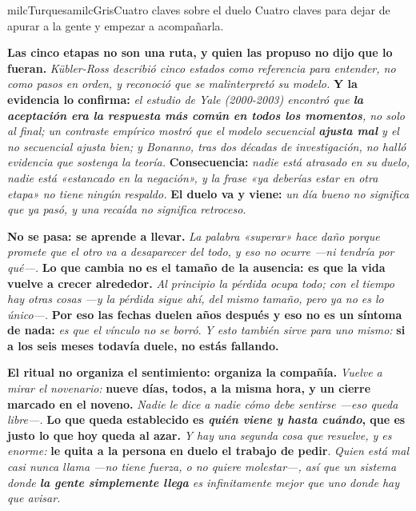 \documentclass[11pt,letterpaper]{article}
\newcommand{\milcpaso}[3]{%
\Needspace{4\baselineskip}%
\begin{tcolorbox}[enhanced,colback=white,colframe=milcLinea,arc=1.5mm,boxrule=.9pt,
  left=14mm,right=4mm,top=3mm,bottom=3mm,before skip=4pt,after skip=4pt,
  fontupper=\RaggedRight,
  overlay={\node[anchor=north west,circle,fill=#2,text=white,inner sep=0pt,
    minimum size=7.4mm,font=\sffamily\bfseries\small]
    at ([xshift=3.6mm,yshift=-3.2mm]frame.north west) {#1};}]
#3
\end{tcolorbox}}
\begin{document}
\begin{softbox}{milcTurquesa}{milcGris}{Cuatro claves sobre el duelo}
Cuatro claves para dejar de apurar a la gente y empezar a acompañarla.
\end{softbox}

\milcpaso{1}{milcTurquesa}{\textbf{Las cinco etapas no son una ruta, y quien las propuso no dijo que lo fueran.} \emph{Kübler-Ross describió cinco estados como referencia para entender, no como pasos en orden, y reconoció que se malinterpretó su modelo.} \textbf{Y la evidencia lo confirma:} \emph{el estudio de Yale (2000-2003) encontró que \textbf{la aceptación era la respuesta más común en todos los momentos}, no solo al final; un contraste empírico mostró que el modelo secuencial \textbf{ajusta mal} y el no secuencial ajusta bien; y Bonanno, tras dos décadas de investigación, no halló evidencia que sostenga la teoría.} \textbf{Consecuencia:} \emph{nadie está atrasado en su duelo, nadie está «estancado en la negación», y la frase «ya deberías estar en otra etapa» no tiene ningún respaldo.} \textbf{El duelo va y viene:} \emph{un día bueno no significa que ya pasó, y una recaída no significa retroceso.}}
\milcpaso{2}{milcTurquesa}{\textbf{No se pasa: se aprende a llevar.} \emph{La palabra «superar» hace daño porque promete que el otro va a desaparecer del todo, y eso no ocurre ---ni tendría por qué---.} \textbf{Lo que cambia no es el tamaño de la ausencia: es que la vida vuelve a crecer alrededor.} \emph{Al principio la pérdida ocupa todo; con el tiempo hay otras cosas ---y la pérdida sigue ahí, del mismo tamaño, pero ya no es lo único---.} \textbf{Por eso las fechas duelen años después y eso no es un síntoma de nada:} \emph{es que el vínculo no se borró}. \emph{Y esto también sirve para uno mismo:} \textbf{si a los seis meses todavía duele, no estás fallando.}}
\milcpaso{3}{milcTurquesa}{\textbf{El ritual no organiza el sentimiento: organiza la compañía.} \emph{Vuelve a mirar el novenario:} \textbf{nueve días, todos, a la misma hora, y un cierre marcado en el noveno.} \emph{Nadie le dice a nadie cómo debe sentirse ---eso queda libre---.} \textbf{Lo que queda establecido es \emph{quién viene y hasta cuándo}, que es justo lo que hoy queda al azar.} \emph{Y hay una segunda cosa que resuelve, y es enorme:} \textbf{le quita a la persona en duelo el trabajo de pedir}. \emph{Quien está mal casi nunca llama ---no tiene fuerza, o no quiere molestar---, así que un sistema donde \textbf{la gente simplemente llega} es infinitamente mejor que uno donde hay que avisar.}}
\end{document}
